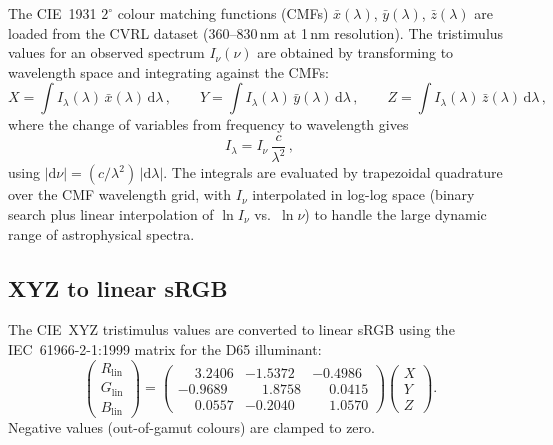 The CIE~1931 $2^{\circ}$ colour matching functions (CMFs)
$\bar{x}(\lambda)$, $\bar{y}(\lambda)$, $\bar{z}(\lambda)$ are loaded
from the CVRL dataset (360--830\,nm at 1\,nm resolution).  The tristimulus
values for an observed spectrum $I_\nu(\nu)$ are obtained by transforming to
wavelength space and integrating against the CMFs:
\begin{equation}
  X = \int I_\lambda(\lambda)\,\bar{x}(\lambda)\,\mathrm{d}\lambda\,,
  \qquad
  Y = \int I_\lambda(\lambda)\,\bar{y}(\lambda)\,\mathrm{d}\lambda\,,
  \qquad
  Z = \int I_\lambda(\lambda)\,\bar{z}(\lambda)\,\mathrm{d}\lambda\,,
  \label{eq:XYZ}
\end{equation}
where the change of variables from frequency to wavelength gives
\begin{equation}
  I_\lambda = I_\nu \,\frac{c}{\lambda^{2}}\,,
  \label{eq:I_lambda}
\end{equation}
using $|\mathrm{d}\nu| = (c/\lambda^{2})\,|\mathrm{d}\lambda|$.
The integrals are evaluated by trapezoidal quadrature over the CMF
wavelength grid, with $I_\nu$ interpolated in log-log space (binary search
plus linear interpolation of $\ln I_\nu$ vs.\ $\ln\nu$) to handle the
large dynamic range of astrophysical spectra.

\subsection{XYZ to linear sRGB}

The CIE~XYZ tristimulus values are converted to linear sRGB using the
IEC~61966-2-1:1999 matrix for the D65 illuminant:
\begin{equation}
  \begin{pmatrix} R_{\mathrm{lin}} \\ G_{\mathrm{lin}} \\ B_{\mathrm{lin}} \end{pmatrix}
  = \begin{pmatrix}
    \phantom{-}3.2406 & -1.5372 & -0.4986 \\
    -0.9689 & \phantom{-}1.8758 & \phantom{-}0.0415 \\
    \phantom{-}0.0557 & -0.2040 & \phantom{-}1.0570
  \end{pmatrix}
  \begin{pmatrix} X \\ Y \\ Z \end{pmatrix}.
  \label{eq:XYZ_to_sRGB}
\end{equation}
Negative values (out-of-gamut colours) are clamped to zero.

